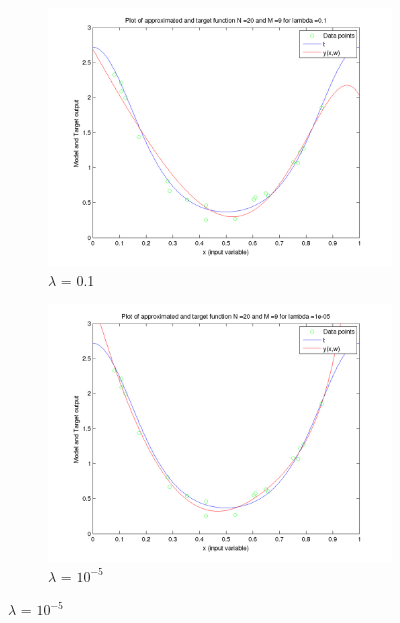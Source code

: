 \documentclass{article}
\begin{document}
\begin{figure}[H]
\begin{subfigure}{.5\textwidth}
\centering
\includegraphics[width=\linewidth]{Varyinglambda_N20M9lambda01}
\caption{$\lambda$ = 0.1}
\end{subfigure}
\begin{subfigure}{.5\textwidth}
\includegraphics[width=\linewidth]{Varyinglambda_N20M9lambda1e-05}
\caption{$\lambda$ = $10^{-5}$}
\end{subfigure}



\end{figure}
\end{document}
